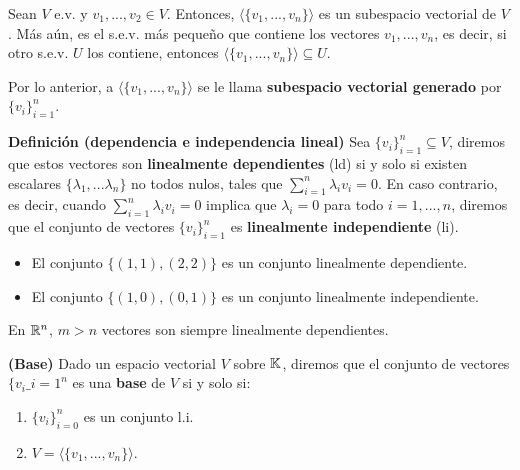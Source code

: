 \begin{proposicion}
	Sean $V$ e.v. y $v_1, ... , v_2  \in V$. Entonces, $\langle \{ v_1, ... , v_n \} \rangle$ es un subespacio vectorial de $V$. Más aún, es el s.e.v. más pequeño que contiene los vectores $v_1, ... , v_n$, es decir, si otro s.e.v. $U$ los contiene, entonces $\langle \{ v_1, ... , v_n \} \rangle \subseteq U$. 
	
	Por lo anterior, a $\langle \{ v_1, ... , v_n \} \rangle$ se le llama \textbf{subespacio vectorial generado} por $\{v_i\}_{i=1}^n$.
\end{proposicion}

\begin{definicion}
	\textbf{Definición (dependencia e independencia lineal)}
	Sea $\{v_i\}_{i=1}^n \subseteq V$, diremos que estos vectores son \textbf{linealmente dependientes} (ld) si y solo si existen escalares $\{ \lambda_1, ... \lambda_n \}$ no todos nulos, tales que $\sum_{i=1}^n \lambda_i v_i = 0$. En caso contrario, es decir, cuando $\sum_{i=1}^n \lambda_i v_i = 0$ implica que $\lambda _i = 0$ para todo $i = 1 , ..., n$, diremos que el conjunto de vectores $\{v_i\}_{i=1}^n$ es \textbf{linealmente independiente} (li). 
\end{definicion}

\begin{ejemplo}
	\begin{itemize}
		\item El conjunto $\{(1,1), (2,2)\}$ es un conjunto linealmente dependiente.   
		\item El conjunto $\{(1,0), (0,1)\}$ es un conjunto linealmente independiente. 
	\end{itemize}  
\end{ejemplo}

\begin{proposicion}
	En $\mathbb{R}^n$, $m > n$ vectores son siempre linealmente dependientes.
\end{proposicion}

\begin{definicion}
	\textbf{(Base)}
	Dado un espacio vectorial $V$ sobre $\mathbb{K}$, diremos que el conjunto de vectores $\{ v_i\_{i = 1}^n$ es una \textbf{base} de $V$ si y solo si: 
	\begin{enumerate}
		\item $\{v_i\}_{i=0}^n$ es un conjunto l.i. 
		\item $V = \langle \{v_1, ... , v_n\}\rangle$. 
	\end{enumerate}
\end{definicion}

